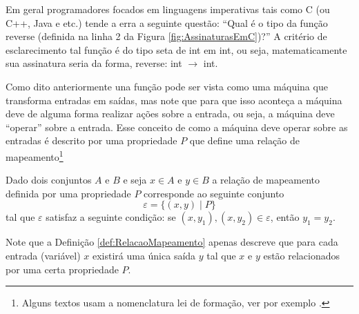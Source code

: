 \begin{note}\label{note:TipoFuncao}
	Em geral programadores focados em linguagens imperativas tais como C (ou C++, Java e etc.) tende a erra a seguinte questão: ``Qual é o tipo da função reverse (definida na linha 2 da Figura \ref{fig:AssinaturasEmC})?'' A critério de esclarecimento tal função é do tipo seta de int em int, ou seja, matematicamente sua assinatura seria da forma, reverse: int $\rightarrow$ int.
\end{note}

Como dito anteriormente una função pode ser vista como uma máquina que transforma entradas em saídas, mas note que para que isso aconteça a máquina deve de alguma forma realizar ações sobre a entrada, ou seja, a máquina deve ``operar'' sobre a entrada. Esse conceito de como a máquina deve operar sobre as entradas é descrito por uma propriedade $P$ que define uma relação de mapeamento\footnote{Alguns textos usam a nomenclatura lei de formação, ver por exemplo \cite{carmo2013}.}

\begin{definition}\label{def:RelacaoMapeamento}
	Dado dois conjuntos $A$ e $B$ e seja $x \in A$ e $y \in B$ a relação de mapeamento definida por uma propriedade $P$ corresponde  ao seguinte conjunto 
	$$\varepsilon = \{(x, y)\mid P\}$$ tal que $\varepsilon$ satisfaz a seguinte condição: se $(x, y_1), (x, y_2) \in \varepsilon$, então $y_1 = y_2$.
\end{definition}

Note que a Definição \ref{def:RelacaoMapeamento} apenas descreve que para cada entrada (variável) $x$ existirá uma única saída $y$ tal que $x$ e  $y$ estão relacionados por uma certa propriedade $P$.

